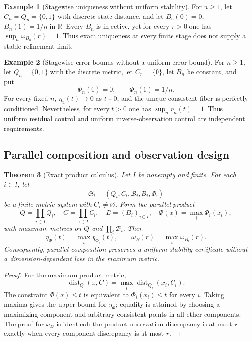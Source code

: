 \documentclass[11pt]{article}
\newtheorem{theorem}{Theorem}[section]
\theoremstyle{definition}
\newtheorem{example}[theorem]{Example}
\theoremstyle{remark}
\numberwithin{equation}{section}
\newcommand{\dist}{\operatorname{dist}}
\newcommand{\cB}{\mathcal B}
\begin{document}
\begin{example}[Stagewise uniqueness without uniform stability]\label{ex:nonuniform}
For $n\ge1$, let $C_n=Q_n=\{0,1\}$ with discrete state distance, and let $B_n(0)=0$, $B_n(1)=1/n$ in $\mathbb R$.  Every $B_n$ is injective, yet for every $r>0$ one has $\sup_n\omega_{B_n}(r)=1$.  Thus exact uniqueness at every finite stage does not supply a stable refinement limit.
\end{example}

\begin{example}[Stagewise error bounds without a uniform error bound]\label{ex:nonuniform-residual}
For $n\ge1$, let $Q_n=\{0,1\}$ with the discrete metric, let $C_n=\{0\}$, let $B_n$ be
constant, and put
\[
 \Phi_n(0)=0,\qquad \Phi_n(1)=1/n.
\]
For every fixed $n$, $\eta_n(t)\to0$ as $t\downarrow0$, and the unique
consistent fiber is perfectly conditioned.  Nevertheless, for every
$t>0$ one has $\sup_n\eta_n(t)=1$.  Thus uniform residual control and uniform
inverse-observation control are independent requirements.
\end{example}

\subsection{Parallel composition and observation design}

\begin{theorem}[Exact product calculus]\label{thm:product-calculus}
Let $I$ be nonempty and finite.  For each $i\in I$, let
\[
 \mathfrak S_i=(Q_i,C_i,\cB_i,B_i,\Phi_i)
\]
be a finite metric system with $C_i\ne\varnothing$.  Form the parallel product
\[
 Q=\prod_{i\in I}Q_i,
 \quad C=\prod_{i\in I}C_i,
 \quad B=(B_i)_{i\in I},
 \quad \Phi(x)=\max_i\Phi_i(x_i),
\]
with maximum metrics on $Q$ and $\prod_i\cB_i$.  Then
\[
 \eta_\Phi(t)=\max_i\eta_{\Phi_i}(t),
 \qquad
 \omega_B(r)=\max_i\omega_{B_i}(r).
\]
Consequently, parallel composition preserves a uniform stability certificate without a dimension-dependent loss in the maximum metric.
\end{theorem}

\begin{proof}
For the maximum product metric,
\[
 \dist_Q(x,C)=\max_i\dist_{Q_i}(x_i,C_i).
\]
The constraint $\Phi(x)\le t$ is equivalent to $\Phi_i(x_i)\le t$ for every $i$.  Taking maxima gives the upper bound for $\eta_\Phi$; equality is attained by choosing a maximizing component and arbitrary consistent points in all other components.  The proof for $\omega_B$ is identical: the product observation discrepancy is at most $r$ exactly when every component discrepancy is at most $r$.
\end{proof}
\end{document}
